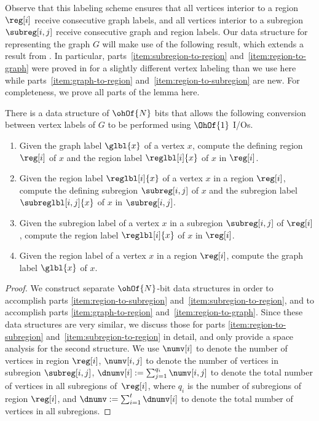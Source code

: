 {Observe that this labeling scheme ensures that all vertices interior
to a region $\reg[i]$ receive consecutive graph labels, and all vertices
interior to a subregion $\subreg[i,j]$ receive consecutive graph and
region labels.
Our data structure for representing the graph $G$ will make use of
the following result, which extends a result from \cite{DBLP:journals/talg/BoseCHMM12}.
In particular, parts~\ref{item:subregion-to-region}
and~\ref{item:region-to-graph} were proved in \cite{DBLP:journals/talg/BoseCHMM12} for a slightly
different vertex labeling than we use here while
parts~\ref{item:graph-to-region} and~\ref{item:region-to-subregion} are new.
For completeness, we prove all parts of the lemma here.

\begin{lemma}
  \label{lem:label_ops}
  There is a data structure of $\ohOf{N}$ bits that allows the following
  conversion between vertex labels of $G$ to be performed using
  $\OhOf{1}$ I/Os.
  \begin{enumerate}[label={(\alph{*})},noitemsep]
  \item Given the graph label $\glbl{x}$ of a vertex $x$, compute the defining
    region $\reg[i]$ of $x$ and the region label $\reglbl[i]{x}$ of $x$ in
    $\reg[i]$.\label{item:graph-to-region}
  \item Given the region label $\reglbl[i]{x}$ of a vertex $x$ in a region
    $\reg[i]$, compute the defining subregion $\subreg[i,j]$ of $x$ and the
    subregion label $\subreglbl[i,j]{x}$ of $x$ in
    $\subreg[i,j]$.\label{item:region-to-subregion}
  \item Given the subregion label of a vertex $x$ in a subregion
    $\subreg[i,j]$ of $\reg[i]$, compute the region label $\reglbl[i]{x}$
    of $x$ in $\reg[i]$.\label{item:subregion-to-region}
  \item Given the region label of a vertex $x$ in a region $\reg[i]$,
    compute the graph label $\glbl{x}$ of $x$.\label{item:region-to-graph}
  \end{enumerate}
\end{lemma}

\begin{proof}
  We construct separate $\ohOf{N}$-bit data structures in order to accomplish parts
  \ref{item:region-to-subregion} and~\ref{item:subregion-to-region}, and to
  accomplish parts \ref{item:graph-to-region} and~\ref{item:region-to-graph}.
  Since these data structures are very similar, we discuss those for
  parts \ref{item:region-to-subregion} and~\ref{item:subregion-to-region} in detail,
  and only provide a space analysis for the second structure.
  We use $\numv[i]$ to denote the number of vertices in region $\reg[i]$,
  $\numv[i,j]$ to denote the number of vertices in subregion $\subreg[i,j]$,
  $\dnumv[i] := \sum_{j=1}^{q_i} \numv[i,j]$ to denote the total number of
  vertices in all subregions of~$\reg[i]$, where $q_i$ is the number of
  subregions of region $\reg[i]$, and $\dnumv := \sum_{i=1}^t \dnumv[i]$ to
  denote the total number of vertices in all subregions.


\end{proof}}
